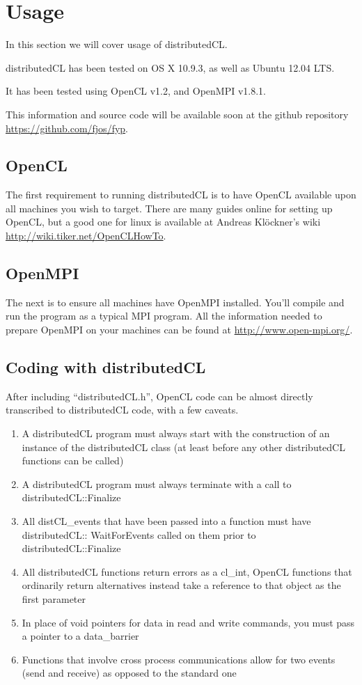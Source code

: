 \documentclass[../thesis.tex]{subfiles}
\begin{document}
\section{Usage} %
\label{sec:usage}

In this section we will cover usage of distributedCL.

distributedCL has been tested on OS X 10.9.3, as well as Ubuntu 12.04 LTS.

It has been tested using OpenCL v1.2, and OpenMPI v1.8.1.

This information and source code will be available soon at the github repository \url{https://github.com/fjos/fyp}.

\subsection{OpenCL} %
\label{sub:opencl_use}
    The first requirement to running distributedCL is to have OpenCL available upon all machines you wish to target. There are many guides online for setting up OpenCL, but a good one for linux is available at Andreas Klöckner's wiki \url{http://wiki.tiker.net/OpenCLHowTo}.
\subsection{OpenMPI} %
\label{sub:openmpi_use}
    The next is to ensure all machines have OpenMPI installed. You'll compile and run the program as a typical MPI program. All the information needed to prepare OpenMPI on your machines can be found at \url{http://www.open-mpi.org/}.

\subsection{Coding with distributedCL} %
\label{sub:coding_with_distributedcl}
    After including ``distributedCL.h'', OpenCL code can be almost directly transcribed to distributedCL code, with a few caveats.
    \begin{enumerate}
    \item A distributedCL program must always start with the construction of an instance of the distributedCL class (at least before any other distributedCL functions can be called)
    \item A distributedCL program must always terminate with a call to distributedCL::Finalize
    \item All distCL\_events that have been passed into a function must have distributedCL:: WaitForEvents called on them prior to distributedCL::Finalize
    \item All distributedCL functions return errors as a cl\_int, OpenCL functions that ordinarily return alternatives instead take a reference to that object as the first parameter
    \item In place of void pointers for data in read and write commands, you must pass a pointer to a data\_barrier
    \item Functions that involve cross process communications allow for two events (send and receive) as opposed to the standard one
    \end{enumerate}
    
\end{document}
